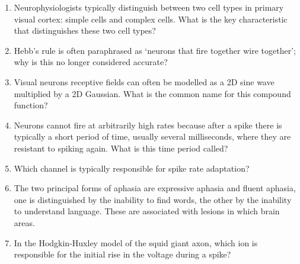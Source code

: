 \documentclass[a4paper,12pt]{article}
\newif\ifsoln
\begin{document}
\begin{enumerate} 

\item Neurophysiologists typically distinguish between two cell types in primary visual cortex: simple cells and complex cells. What is the key characteristic that distinguishes these two cell types?

\ifsoln Solution: Complex cell responses are spatially invariant to
the stimulus location, simple cell responses are not.  \fi

\item Hebb's rule is often paraphrased as \lq{}neurons that fire together wire together\rq{}; why is this no longer considered accurate?

\ifsoln Solution:  It ignores the temporal structure; spike timing effects are now considered important.\fi

\item Visual neurons receptive fields can often be modelled as a 2D sine wave multiplied by a 2D Gaussian. What is the common name for this compound function? 

\ifsoln Solution:  Gabor function/filter. \fi

\item  Neurons cannot fire at arbitrarily high rates because after a spike there is typically a short period of time, usually several milliseconds, where they are resistant to spiking again. What is this time period called? 

\ifsoln Solution:  The refractory period.\fi

\item Which channel is typically responsible for spike rate adaptation?

\ifsoln Solution:  Slow potassium. \fi

\item The two principal forms of aphasia are expressive aphasia and
  fluent aphasia, one is distinguished by the inability to find words,
  the other by the inability to understand language. These are
  associated with lesions in which brain areas.

\ifsoln Solution:  Broca's area and Wernicke's area.\fi


\item In the Hodgkin-Huxley model of the squid giant axon, which ion
  is responsible for the initial rise in the voltage during a spike?

\ifsoln Solution:  Sodium.\fi


\end{enumerate}
\end{document}

